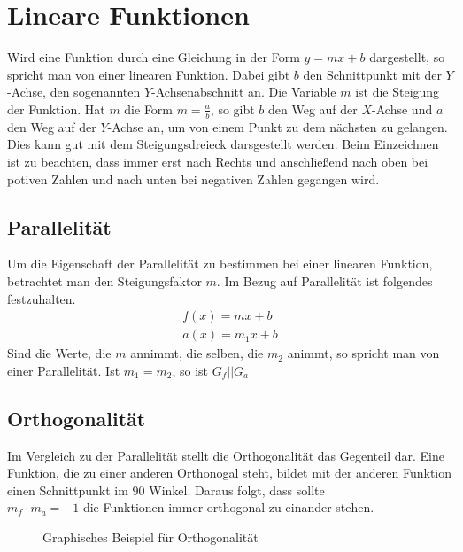 \section{Lineare Funktionen}\label{sec:Lineare Funktionen}
Wird eine Funktion durch eine Gleichung in der Form $y=mx+b$ dargestellt, so spricht man von einer linearen Funktion. Dabei gibt $b$ den Schnittpunkt mit der $Y$-Achse, den sogenannten $Y$-Achsenabschnitt an. Die Variable $m$ ist die Steigung der Funktion. Hat $m$ die Form $m=\frac{a}{b}$, so gibt $b$ den Weg auf der $X$-Achse und $a$ den Weg auf der $Y$-Achse an, um von einem Punkt zu dem nächsten zu gelangen. Dies kann gut mit dem Steigungsdreieck darsgestellt werden. Beim Einzeichnen ist zu beachten, dass immer erst nach Rechts und anschließend nach oben bei potiven Zahlen und nach unten bei negativen Zahlen gegangen wird.
\subsection{Parallelität}\label{sec:Lineare Funktionen/Parallelitaet}
 Um die Eigenschaft der Parallelität zu bestimmen bei einer linearen Funktion, betrachtet man den Steigungsfaktor $m$.
Im Bezug auf Parallelität ist folgendes festzuhalten. 
\begin{align*}
	f(x)=mx+b\\
	a(x)=m_1x+b
\end{align*}
Sind die Werte, die $m$ annimmt, die selben, die $m_2$ animmt, so spricht man von einer Parallelität. Ist $m_1=m_2$, so ist $G_f||G_a$
\subsection{Orthogonalität}\label{sec:Lineare Funktionen/Orthogonalitaet}
 Im Vergleich zu der Parallelität stellt die Orthogonalität das Gegenteil dar. Eine Funktion, die zu einer anderen Orthonogal steht, bildet mit der anderen Funktion einen Schnittpunkt im 90\degree{} Winkel. Daraus folgt, dass sollte \\$m_f\cdot m_a=-1$ die Funktionen immer orthogonal zu einander stehen.
\begin{figure}[h!]
\centering
{}
\caption{Graphisches Beispiel für Orthogonalität}
\end{figure}
